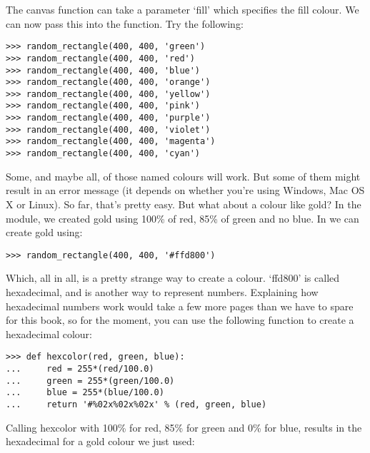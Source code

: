 The canvas  function can take a parameter `fill' which specifies the fill colour.  We can now pass this into the function. Try the following:

\begin{listing}
\begin{verbatim}
>>> random_rectangle(400, 400, 'green')
>>> random_rectangle(400, 400, 'red')
>>> random_rectangle(400, 400, 'blue')
>>> random_rectangle(400, 400, 'orange')
>>> random_rectangle(400, 400, 'yellow')
>>> random_rectangle(400, 400, 'pink')
>>> random_rectangle(400, 400, 'purple')
>>> random_rectangle(400, 400, 'violet')
>>> random_rectangle(400, 400, 'magenta')
>>> random_rectangle(400, 400, 'cyan')
\end{verbatim}
\end{listing}

Some, and maybe all, of those named colours will work.  But some of them might result in an error message (it depends on whether you're using Windows, Mac OS X or Linux). So far, that's pretty easy.  But what about a colour like gold?  In the  module, we created gold using 100\% of red, 85\% of green and no blue.  In  we can create gold using:

\begin{listing}
\begin{verbatim}
>>> random_rectangle(400, 400, '#ffd800')
\end{verbatim}
\end{listing}

Which, all in all, is a pretty strange way to create a colour.  `ffd800' is called hexadecimal, and is another way to represent numbers.  Explaining how hexadecimal numbers work would take a few more pages than we have to spare for this book, so for the moment, you can use the following function to create a hexadecimal colour:

\begin{listing}
\begin{verbatim}
>>> def hexcolor(red, green, blue):
...     red = 255*(red/100.0)
...     green = 255*(green/100.0)
...     blue = 255*(blue/100.0)
...     return '#%02x%02x%02x' % (red, green, blue)
\end{verbatim}
\end{listing}

Calling hexcolor with 100\% for red, 85\% for green and 0\% for blue, results in the hexadecimal for a gold colour we just used:

